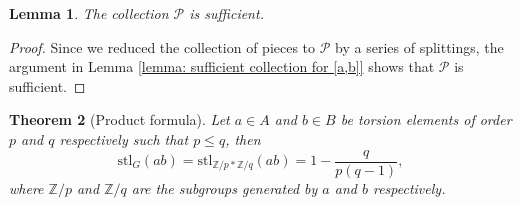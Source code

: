 \documentclass{amsart}
\newtheorem{theorem}{Theorem}[section]
\newtheorem{lemma}[theorem]{Lemma}
\theoremstyle{definition}
\numberwithin{equation}{section}
\theoremstyle{theorem}
\theoremstyle{remark}
\def\Z{\mathbb Z}
\def\stl{\mathrm{stl}}
\begin{document}
	\begin{lemma}
		The collection $\mathcal{P}$ is sufficient. 
	\end{lemma}
	
	\begin{proof}
		Since we reduced the collection of pieces to $\mathcal{P}$ by a series of splittings, the argument in Lemma \ref{lemma: sufficient collection for [a,b]} shows that $\mathcal{P}$ is sufficient.
	\end{proof}
	
	\begin{theorem}[Product formula]\label{thm: product formula}
		Let $a\in A$ and $b\in B$ be torsion elements of order $p$ and $q$ respectively such that $p\leq q$, then 
		$$\stl_G(ab)=\stl_{\Z/p*\Z/q}(ab)=1-\frac{q}{p(q-1)},$$
		where $\Z/p$ and $\Z/q$ are the subgroups generated by $a$ and $b$ respectively.
	\end{theorem}
\end{document}
